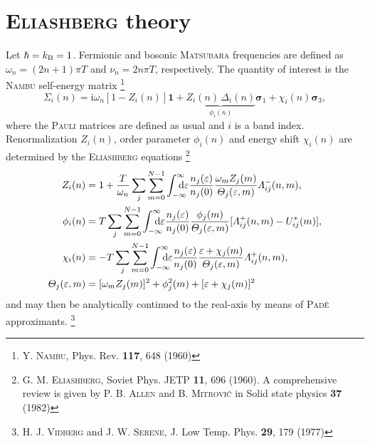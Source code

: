 \documentclass[a4paper]{article}
\def\D{\mathrm d}
\def\I{\mathrm i}
\def\sub#1{\sb{\mathrm{#1}}}
\def\from#1{\sb{\mathrlap{#1}}}
\def\till#1{\sp{\mathrlap{#1}}}
\let\vec\boldsymbol
\let\Delta\varDelta
\let\epsilon\varepsilon
\let\Lambda\varLambda
\let\Sigma\varSigma
\let\Theta\varTheta
\def\headline#1{\section*{%
   \normalsize\normalfont%
   \rlap{\rule[0.5ex]\textwidth{0.4pt}}%
   \qquad\colorbox{white}{#1}%
   }}
\begin{document}
   \headline{\textsc{Eliashberg} theory}

   Let $\hbar = k \sub B = 1$. Fermionic and bosonic \textsc{Matsubara}
   frequencies are defined as $\omega_n = (2 n + 1) \pi T$ and $\nu_n = 2 n \pi
   T$, respectively. The quantity of interest is the \textsc{Nambu} self-energy
   matrix%
   \footnote{Y. \textsc{Nambu}, Phys. Rev. \textbf{117}, 648 (1960)}
   \begin{equation*}
      \vec \Sigma_i(n)
      = \I \omega_n [1 - Z_i(n)] \vec 1
      + \underbrace{Z_i(n) \, \Delta_i(n)}
      _ {\displaystyle \phi_i(n)} \vec \sigma_1
      + \chi_i(n) \vec \sigma_3,
   \end{equation*}
   where the \textsc{Pauli} matrices are defined as usual and $i$ is a band
   index. Renormalization $Z_i(n)$, order parameter $\phi_i(n)$ and energy shift
   $\chi_i(n)$ are determined by the \textsc{Eliashberg} equations%
   \footnote{%
      G. M. \textsc{Eliashberg}, Soviet Phys. JETP \textbf{11}, 696 (1960).
      \newline
      A comprehensive review is given by P. B. \textsc{Allen} and B.
      \textsc{Mitrović} in Solid state physics \textbf{37} (1982)
      }
   \begin{equation}
      \begin{split}
         Z_i(n) &= 1 + \frac T {\omega_n} \sum_j \sum_{m = 0}^{N - 1}
         \int \from{-\infty} \till \infty \D \epsilon
         \frac{n_j(\epsilon)}{n_j(0)}
         \frac{\omega_m Z_j (m)}{\Theta_j(\epsilon, m)}
         \Lambda_{i j}^-(n, m),
         \\
         \phi_i(n) &= T \sum_j \sum_{m = 0}^{N - 1}
         \int \from{-\infty} \till \infty \D \epsilon
         \frac{n_j(\epsilon)}{n_j(0)}
         \frac{\phi_j(m)}{\Theta_j(\epsilon, m)}
         [\Lambda_{i j}^+(n, m) - U^*_{i j}(m)],
         \\
         \chi_i(n) &= -T \sum_j \sum_{m = 0}^{N - 1}
         \int \from{-\infty} \till \infty \D \epsilon
         \frac{n_j(\epsilon)}{n_j(0)}
         \frac{\epsilon + \chi_j(m)}{\Theta_j(\epsilon, m)}
         \Lambda_{i j}^+(n, m),
         \\
         \Theta_j(\epsilon, m) &=
         [\omega_m Z_j(m)]^2 + \phi_j^2(m) + [\epsilon + \chi_j(m)]^2
      \end{split}
      \label{Eliashberg equations}
   \end{equation}
   and may then be analytically continued to the real-axis by means of
   \textsc{Padé} approximants.%
   \footnote{%
      H. J. \textsc{Vidberg} and J. W. \textsc{Serene}, J. Low Temp. Phys.
      \textbf{29}, 179 (1977)
      }
\end{document}
